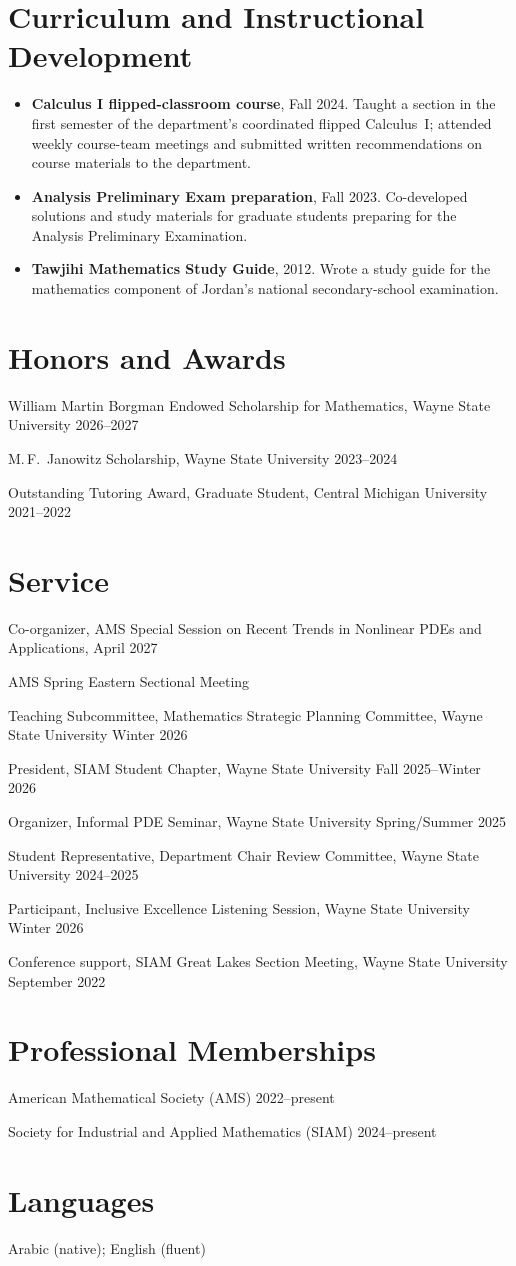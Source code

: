 \documentclass[11pt]{article}
\newcommand{\entry}[2]{\noindent #1 \hfill #2\par}
\begin{document}
\section{Curriculum and Instructional Development}
\begin{itemize}
  \item \textbf{Calculus I flipped-classroom course}, Fall 2024. Taught a section in the first semester of the
        department's coordinated flipped Calculus~I; attended weekly course-team meetings and submitted
        written recommendations on course materials to the department.
  \item \textbf{Analysis Preliminary Exam preparation}, Fall 2023. Co-developed solutions and study materials
        for graduate students preparing for the Analysis Preliminary Examination.
  \item \textbf{Tawjihi Mathematics Study Guide}, 2012. Wrote a study guide for the mathematics component of
        Jordan's national secondary-school examination.
\end{itemize}

\section{Honors and Awards}
\entry{William Martin Borgman Endowed Scholarship for Mathematics, Wayne State University}{2026--2027}
\entry{M.\,F.~Janowitz Scholarship, Wayne State University}{2023--2024}
\entry{Outstanding Tutoring Award, Graduate Student, Central Michigan University}{2021--2022}

\section{Service}
\entry{Co-organizer, AMS Special Session on Recent Trends in Nonlinear PDEs and Applications,}{April 2027}
\hspace*{1.2em}AMS Spring Eastern Sectional Meeting\par
\entry{Teaching Subcommittee, Mathematics Strategic Planning Committee, Wayne State University}{Winter 2026}
\entry{President, SIAM Student Chapter, Wayne State University}{Fall 2025--Winter 2026}
\entry{Organizer, Informal PDE Seminar, Wayne State University}{Spring/Summer 2025}
\entry{Student Representative, Department Chair Review Committee, Wayne State University}{2024--2025}
\entry{Participant, Inclusive Excellence Listening Session, Wayne State University}{Winter 2026}
\entry{Conference support, SIAM Great Lakes Section Meeting, Wayne State University}{September 2022}

\section{Professional Memberships}
\entry{American Mathematical Society (AMS)}{2022--present}
\entry{Society for Industrial and Applied Mathematics (SIAM)}{2024--present}

\section{Languages}
Arabic (native); English (fluent)
\end{document}
